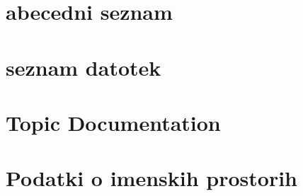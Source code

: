 \documentclass[twoside]{book}
\newcommand{\+}{\discretionary{\mbox{\scriptsize$\hookleftarrow$}}{}{}}
\begin{document}
\chapter{abecedni seznam}

\chapter{seznam datotek}

\chapter{Topic Documentation}











\chapter{Podatki o imenskih prostorih}















\end{document}
